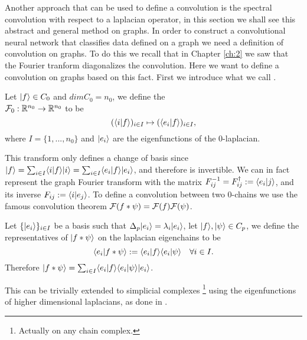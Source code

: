 \documentclass[../3.tex]{subfiles}
\begin{document}
    Another approach that can be used to define a convolution is the spectral convolution with respect to a laplacian operator, in this section
    we shall see this abstract and general method on graphs.
    In order to construct a convolutional neural network that classifies data defined on a graph we need a definition of convolution on graphs.
    To do this we recall that in Chapter \ref{ch:2} we saw that the Fourier tranform diagonalizes the convolution. Here we want to define a convolution on graphs
    based on this fact. First we introduce what we call .
    
    \begin{defn}
        Let $| f \rangle \in C_0$ and $dimC_0 = n_0$, we define the \\
        $\mathcal{F}_0 : \mathbb{R}^{n_0} \to \mathbb{R}^{n_0}$ to be
        \[ (\langle i | f \rangle)_{i \in I} \mapsto (\langle e_i | f \rangle)_{i \in I},\]
        where $I = \{1,...,n_0\}$ and $| e_i \rangle$ are the eigenfunctions of the $0$-laplacian.
    \end{defn}

    This transform only defines a change of basis since $| f \rangle = \sum_{i \in I}\langle i | f \rangle| i \rangle = \sum_{i \in I}\langle e_i | f \rangle| e_i \rangle$, and therefore is invertible.
    We can in fact represent the graph Fourier transform with the matrix $F^{-1}_{ij} = F^\dagger_{ij} := \langle e_i | j \rangle$, and its inverse $F_{ij} := \langle i | e_j \rangle$.
    To define a convolution between two $0$-chains we use the famous convolution theorem $\mathcal{F}(f * \psi) = \mathcal{F}(f)\mathcal{F}(\psi)$. 

    \begin{defn}
        Let $\{| e_i \rangle\}_{i \in I}$ be a basis such that $\Delta_p| e_i \rangle = \lambda_i| e_i \rangle$, let $| f \rangle,| \psi \rangle \in C_p$, we define the representatives of $| f * \psi \rangle$ on
        the laplacian eigenchains to be 
        \[ \langle e_i | f * \psi \rangle := \langle e_i | f \rangle\langle e_i | \psi \rangle \quad \forall i \in I.\]
        Therefore $| f * \psi \rangle = \sum_{i \in I}\langle e_i | f \rangle\langle e_i | \psi \rangle| e_i \rangle$.
    \end{defn}

    This can be trivially extended to simplicial complexes \footnote{Actually on any chain complex.} using the eigenfunctions of higher dimensional laplacians, as done in \cite{simplicialNN}.
\end{document}
